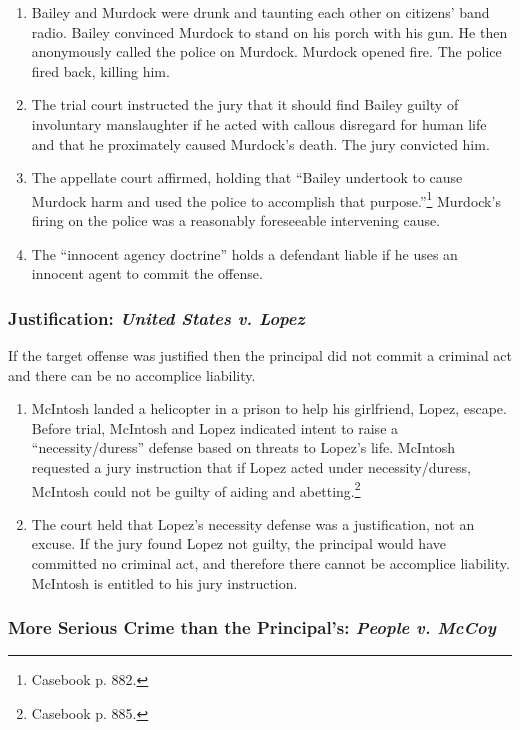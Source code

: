 \begin{enumerate}
    \item Bailey and Murdock were drunk and taunting each other on citizens' 
    band radio. Bailey convinced Murdock to stand on his porch with his gun. 
    He then anonymously called the police on Murdock. Murdock opened fire. The 
    police fired back, killing him.
    \item The trial court instructed the jury that it should find Bailey 
    guilty of involuntary manslaughter if he acted with callous disregard for 
    human life and that he proximately caused Murdock's death. The jury 
    convicted him.
    \item The appellate court affirmed, holding that ``Bailey undertook to 
    cause Murdock harm and used the police to accomplish that 
    purpose.''\footnote{Casebook p. 882.} Murdock's firing on the police was a 
    reasonably foreseeable intervening cause.
    \item The ``innocent agency doctrine'' holds a defendant liable if he 
    uses an innocent agent to commit the offense.
\end{enumerate}

\subsubsection{Justification: \emph{United States v. Lopez}}

If the target offense was justified then the principal did not commit a 
criminal act and there can be no accomplice liability.

\begin{enumerate}
    \item McIntosh landed a helicopter in a prison to help his girlfriend, 
    Lopez, escape. Before trial, McIntosh and Lopez indicated intent to raise 
    a ``necessity/duress'' defense based on threats to Lopez's life. McIntosh 
    requested a jury instruction that if Lopez acted under necessity/duress, 
    McIntosh could not be guilty of aiding and abetting.\footnote{Casebook p. 
    885.}
    \item The court held that Lopez's necessity defense was a justification, 
    not an excuse. If the jury found Lopez not guilty, the principal would 
    have committed no criminal act, and therefore there cannot be accomplice 
    liability. McIntosh is entitled to his jury instruction.
\end{enumerate}

\subsubsection{More Serious Crime than the Principal's: \emph{People v. McCoy}}


